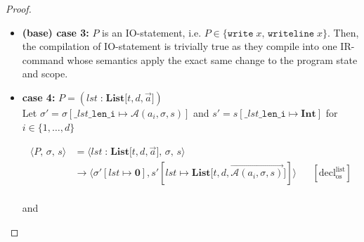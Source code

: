 \documentclass{article}
\begin{document}
\begin{proof}
\begin{itemize}
    \[
      \begin{aligned}
      \langle P,\, \sigma,\, s \rangle
      &=\langle \texttt{pass},\, \sigma,\, s \rangle \\
      &\rightarrow \langle \sigma ,\, s \rangle
      && [ \text{pass}_{\text{os}} ] \\   
      \end{aligned}
  \]
  
  and

  \[
      \begin{aligned}
      \langle \mathcal{C}(P),\, e,\, \sigma,\, s,\, pc \rangle
      &= \langle \mathcal{C}(\texttt{pass}),\, e,\, \sigma,\, s,\, pc \rangle \\
      &= \langle \texttt{NOOP},\, e,\, \sigma,\, s,\, pc \rangle
      && \text{(definition of } \mathcal{C}\text{)} \\   
      &= \langle \epsilon,\, e,\, \sigma ,\, s,\, pc+1 \rangle
      && \text{(operational semantics)} \\ 
      \end{aligned}
  \]

    \item \textbf{(base) case 3:} $P$ is an IO-statement, i.e. $P \in \{ \texttt{write}\;x ,\, \texttt{writeline}\; x \}$. Then, the compilation of IO-statement is trivially true as they compile into one IR-command whose semantics apply the exact same change to the program state and scope.

    \item \textbf{case 4:} $P = (lst \;\texttt{:}\; \textbf{List[$t, d, \vec{a}$]})$\\

    Let $\sigma' = \sigma[\texttt{\_$lst$\_len\_i} \mapsto \mathcal{A}(a_i, \sigma, s)]$ and $s' = s[\texttt{\_$lst$\_len\_i} \mapsto \textbf{Int}]$ for $ i \in \{1,\dots,d\}$ 

        \[
          \begin{aligned}
          \langle P,\, \sigma,\, s \rangle
          &=\langle lst \;\texttt{:}\; \textbf{List[$t, d, \vec{a}$]},\, \sigma,\, s \rangle \\
          &\rightarrow \langle \sigma'[lst \mapsto \textbf{0}], s'[lst \mapsto \textbf{List[$t, d, \vec{\mathcal{A}(a_i, \sigma, s)}$]}] \rangle
          && [ \text{decl}^\text{list}_{\text{os}} ]\\   
          \end{aligned}
      \]
    
      and


\end{itemize}
\end{proof}
\end{document}
